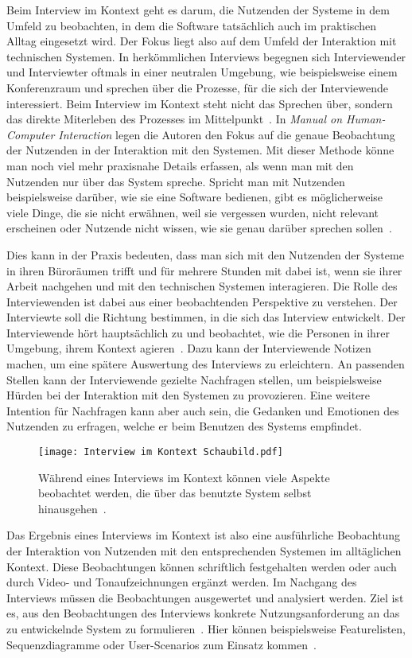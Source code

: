 Beim Interview im Kontext geht es darum, die Nutzenden der Systeme in dem
Umfeld zu beobachten, in dem die Software tatsächlich auch im praktischen
Alltag eingesetzt wird. Der Fokus liegt also auf dem Umfeld der Interaktion mit
technischen Systemen. In herkömmlichen Interviews begegnen sich Interviewender und
Interviewter oftmals in einer neutralen Umgebung, wie beispielsweise einem
Konferenzraum und sprechen über die Prozesse, für die sich der Interviewende
interessiert. Beim Interview im Kontext steht nicht das Sprechen über, sondern das direkte Miterleben des Prozesses im Mittelpunkt~\cite{contextualDesign}. In \textit{Manual on Human-Computer Interaction} legen die Autoren den Fokus auf die genaue Beobachtung der
Nutzenden in der Interaktion mit den Systemen. Mit dieser Methode könne man
noch viel mehr praxisnahe Details erfassen, als wenn man mit den Nutzenden nur
über das System spreche. Spricht man mit Nutzenden beispielsweise darüber, wie
sie eine Software bedienen, gibt es möglicherweise viele Dinge, die sie nicht
erwähnen, weil sie vergessen wurden, nicht relevant erscheinen oder Nutzende
nicht wissen, wie sie genau darüber sprechen sollen~\cite{hciHandbook}.

Dies kann in der Praxis bedeuten, dass man sich mit den Nutzenden der Systeme
in ihren Büroräumen trifft und für mehrere Stunden mit dabei ist, wenn sie
ihrer Arbeit nachgehen und mit den technischen Systemen interagieren. Die Rolle
des Interviewenden ist dabei aus einer beobachtenden Perspektive zu verstehen.
Der Interviewte soll die Richtung bestimmen, in die sich das Interview
entwickelt. Der Interviewende hört hauptsächlich zu und beobachtet, wie die
Personen in ihrer Umgebung, ihrem Kontext agieren~\cite{hciHandbook}. Dazu kann
der Interviewende Notizen machen, um eine spätere Auswertung des Interviews zu
erleichtern. An passenden Stellen kann der Interviewende gezielte Nachfragen
stellen, um beispielsweise Hürden bei der Interaktion mit den Systemen zu
provozieren. Eine weitere Intention für Nachfragen kann aber auch sein, die
Gedanken und Emotionen des Nutzenden zu erfragen, welche er beim Benutzen des
Systems empfindet.

\begin{figure}[h]
    \caption{Während eines Interviews im Kontext können viele Aspekte beobachtet werden, die über das benutzte System selbst hinausgehen~\cite{johannesGrafik}.}
    \centering
    \texttt{[image: Interview im Kontext Schaubild.pdf]}
\end{figure}

Das Ergebnis eines Interviews im Kontext ist also eine ausführliche Beobachtung
der Interaktion von Nutzenden mit den entsprechenden Systemen im alltäglichen
Kontext. Diese Beobachtungen können schriftlich festgehalten werden oder auch
durch Video- und Tonaufzeichnungen ergänzt werden. Im Nachgang des Interviews
müssen die Beobachtungen ausgewertet und analysiert werden. Ziel ist es, aus den Beobachtungen des Interviews konkrete Nutzungsanforderung an das zu
entwickelnde System zu formulieren~\cite{HMI-HCD}. Hier können beispielsweise Featurelisten,
Sequenzdiagramme oder User-Scenarios zum Einsatz kommen~\cite{sequenceDiagrams}.